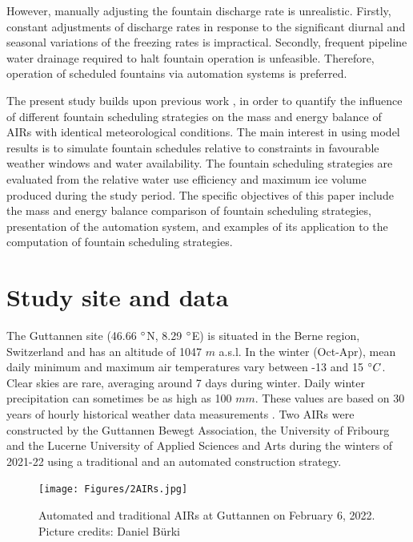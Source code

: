 \documentclass[tc, manuscript]{copernicus}
\begin{document}
However, manually adjusting the fountain discharge rate is unrealistic. Firstly, constant adjustments of
discharge rates in response to the significant diurnal and seasonal variations of the freezing rates is
impractical. Secondly, frequent pipeline water drainage required to halt fountain operation is unfeasible.
Therefore, operation of scheduled fountains via automation systems is preferred.

The present study builds upon previous work \citep{balasubramanianInfluenceMeteorologicalConditions2022,
oerlemansBriefCommunicationGrowth2021}, in order to quantify the influence of different fountain scheduling
strategies on the mass and energy balance of AIRs with identical meteorological conditions. The main interest in
using model results is to simulate fountain schedules relative to constraints in favourable weather windows and
water availability. The fountain scheduling strategies are evaluated from the relative water use efficiency and
maximum ice volume produced during the study period. The specific objectives of this paper include the mass and
energy balance comparison of fountain scheduling strategies, presentation of the automation system, and examples
of its application to the computation of fountain scheduling strategies.

\section{Study site and data}

The Guttannen site (46.66 $^{\circ}$N, 8.29 $^{\circ}$E) is situated in the Berne region, Switzerland and has an
altitude of 1047 $m$ a.s.l. In the winter (Oct-Apr), mean daily minimum and maximum air temperatures vary
between -13 and 15 $^{\circ} C$. Clear skies are rare, averaging around 7 days during winter. Daily winter
precipitation can sometimes be as high as 100 $mm$. These values are based on 30 years of hourly historical
weather data measurements \citep{meteoblueClimateGuttannen}. Two AIRs were constructed by the Guttannen Bewegt Association,
the University of Fribourg and the Lucerne University of Applied Sciences and Arts during the winters of 2021-22
using a traditional and an automated construction strategy.

\begin{figure}[t]
\texttt{[image: Figures/2AIRs.jpg]}
\caption{Automated and traditional AIRs at Guttannen on February 6, 2022. Picture credits: Daniel Bürki}
\label{fig:2AIR} 
\end{figure}
\end{document}
